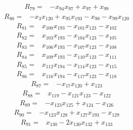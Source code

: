 {%
\begin{align*}
R_{79} ={}& -x_{94} x_{97} + x_{97} + x_{99}
\end{align*}
\begin{align*}
R_{80} ={}& -x_{3} x_{120} + x_{95} x_{193} - x_{98} - x_{99} x_{120}
\end{align*}
\begin{align*}
R_{81} ={}& x_{100} x_{193} - x_{101} x_{123} - x_{102}
\end{align*}
\begin{align*}
R_{82} ={}& x_{103} x_{193} - x_{104} x_{123} - x_{105}
\end{align*}
\begin{align*}
R_{83} ={}& x_{106} x_{193} - x_{107} x_{123} - x_{108}
\end{align*}
\begin{align*}
R_{84} ={}& x_{109} x_{193} - x_{110} x_{123} - x_{111}
\end{align*}
\begin{align*}
R_{85} ={}& x_{112} x_{194} - x_{114} x_{123} - x_{115}
\end{align*}
\begin{align*}
R_{86} ={}& x_{116} x_{194} - x_{117} x_{123} - x_{118}
\end{align*}
\begin{align*}
R_{87} ={}& -x_{17} x_{120} + x_{123}
\end{align*}
\begin{align*}
R_{88} ={}& x_{119} - x_{121} x_{123} - x_{122}
\end{align*}
\begin{align*}
R_{89} ={}& -x_{123} x_{125} + x_{124} - x_{126}
\end{align*}
\begin{align*}
R_{90} ={}& -x_{123} x_{128} + x_{127} x_{193} - x_{129}
\end{align*}
\begin{align*}
R_{91} ={}& x_{130} - 2x_{130} x_{132} + x_{133}
\end{align*}
}
